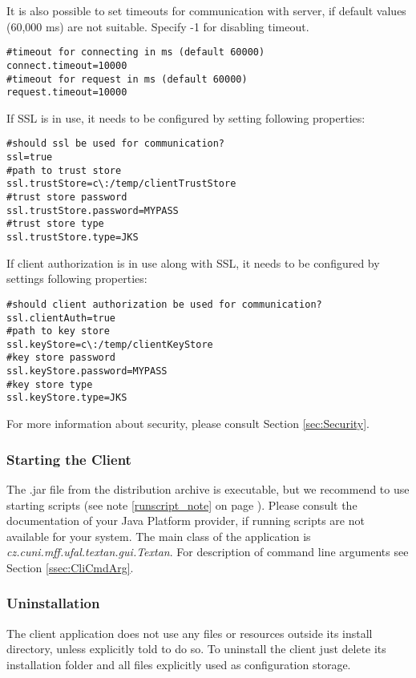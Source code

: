 It is also possible to set timeouts for communication with server, if default
values (60,000 ms) are not suitable. Specify -1 for disabling timeout.
\begin{lstlisting}[frame=single,language=properties]
#timeout for connecting in ms (default 60000)
connect.timeout=10000
#timeout for request in ms (default 60000)
request.timeout=10000
\end{lstlisting}

If SSL is in use, it needs to be configured by setting following properties:
\begin{lstlisting}[frame=single,language=properties]
#should ssl be used for communication?
ssl=true
#path to trust store
ssl.trustStore=c\:/temp/clientTrustStore
#trust store password
ssl.trustStore.password=MYPASS
#trust store type
ssl.trustStore.type=JKS
\end{lstlisting}

If client authorization is in use along with SSL, it needs to be configured
by settings following properties:
\begin{lstlisting}[frame=single,language=properties]
#should client authorization be used for communication?
ssl.clientAuth=true
#path to key store
ssl.keyStore=c\:/temp/clientKeyStore
#key store password
ssl.keyStore.password=MYPASS
#key store type
ssl.keyStore.type=JKS
\end{lstlisting}

For more information about security, please consult Section \ref{sec:Security}.

\subsubsection{Starting the Client}
\label{sssec:StartClient}

The .jar file from the distribution archive is executable,
but we recommend to use starting scripts (see note \ref{runscript_note} on page
\pageref{runscript_note}). Please consult the documentation of your Java
Platform provider, if running scripts are not available for your system. The
main class of the application is \emph{cz.cuni.mff.ufal.textan.gui.Textan}.
For description of command line arguments see Section \ref{ssec:CliCmdArg}.

\subsubsection{Uninstallation}

The client application does not use any files or resources outside its install
directory, unless explicitly told to do so. To uninstall the client just delete
its installation folder and all files explicitly used as configuration storage.

